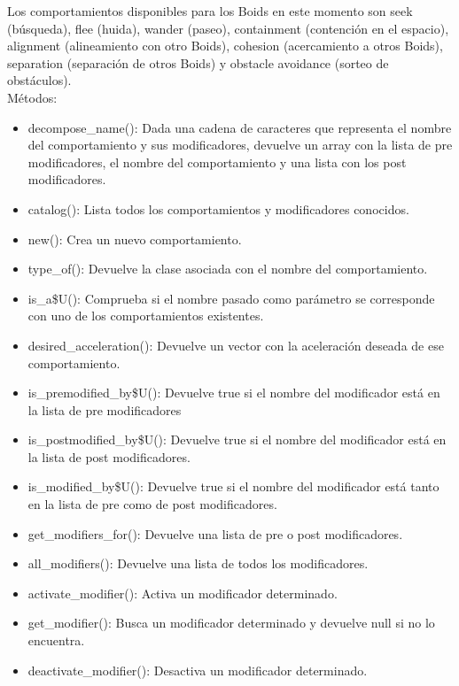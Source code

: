 Los comportamientos disponibles para los Boids en este momento son seek (búsqueda), flee (huida), wander (paseo), containment (contención 
en el espacio), alignment (alineamiento con otro Boids), cohesion (acercamiento a otros Boids), separation (separación de otros Boids) y 
obstacle avoidance (sorteo de obstáculos).\\

Métodos:
\begin{itemize}
\item decompose\_name():
Dada una cadena de caracteres que representa el nombre del comportamiento y sus modificadores, devuelve un array con la lista de pre
modificadores, el nombre del comportamiento y una lista con los post modificadores.

\item catalog():
Lista todos los comportamientos y modificadores conocidos.

\item new():
Crea un nuevo comportamiento.

\item type\_of():
Devuelve la clase asociada con el nombre del comportamiento.

\item is\_a\$U():
Comprueba si el nombre pasado como parámetro se corresponde con uno de los comportamientos existentes.

\item desired\_acceleration():
Devuelve un vector con la aceleración deseada de ese comportamiento.

\item is\_premodified\_by\$U():
Devuelve true si el nombre del modificador está en la lista de pre modificadores

\item is\_postmodified\_by\$U():
Devuelve true si el nombre del modificador está en la lista de post modificadores.

\item is\_modified\_by\$U():
Devuelve true si el nombre del modificador está tanto en la lista de pre como de post modificadores.

\item get\_modifiers\_for():
Devuelve una lista de pre o post modificadores.

\item all\_modifiers():
Devuelve una lista de todos los modificadores.

\item activate\_modifier():
Activa un modificador determinado.

\item get\_modifier():
Busca un modificador determinado y devuelve null si no lo encuentra.

\item deactivate\_modifier():
Desactiva un modificador determinado.
\end{itemize}


